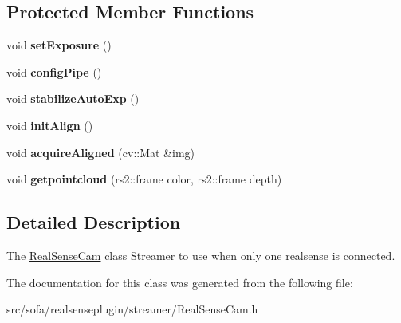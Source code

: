 \subsection*{Protected Member Functions}
\begin{DoxyCompactItemize}
\item 
\mbox{\label{classsofa_1_1rgbdtracking_1_1_real_sense_cam_ad11af2a678cdbe9d4cb69160654ddc59}} 
void {\bfseries set\+Exposure} ()
\item 
\mbox{\label{classsofa_1_1rgbdtracking_1_1_real_sense_cam_a60647ccc41e670ac3f5d7ad8b5d96194}} 
void {\bfseries config\+Pipe} ()
\item 
\mbox{\label{classsofa_1_1rgbdtracking_1_1_real_sense_cam_a90411168a51a6899f412391bfae3b7ed}} 
void {\bfseries stabilize\+Auto\+Exp} ()
\item 
\mbox{\label{classsofa_1_1rgbdtracking_1_1_real_sense_cam_a6825194f2f9395c96f27737c574e517d}} 
void {\bfseries init\+Align} ()
\item 
\mbox{\label{classsofa_1_1rgbdtracking_1_1_real_sense_cam_a29789038ece88a4d6485c0f6d01abe70}} 
void {\bfseries acquire\+Aligned} (cv\+::\+Mat \&img)
\item 
\mbox{\label{classsofa_1_1rgbdtracking_1_1_real_sense_cam_a14c83fdb652f4d40a95a402dd930f7a9}} 
void {\bfseries getpointcloud} (rs2\+::frame color, rs2\+::frame depth)
\end{DoxyCompactItemize}


\subsection{Detailed Description}
The \hyperlink{classsofa_1_1rgbdtracking_1_1_real_sense_cam}{Real\+Sense\+Cam} class Streamer to use when only one realsense is connected. 

The documentation for this class was generated from the following file\+:\begin{DoxyCompactItemize}
\item 
src/sofa/realsenseplugin/streamer/Real\+Sense\+Cam.\+h\end{DoxyCompactItemize}
